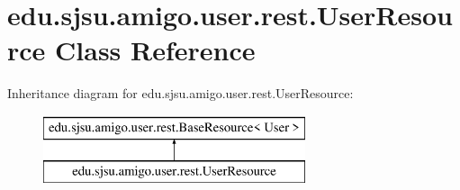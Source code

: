 \hypertarget{classedu_1_1sjsu_1_1amigo_1_1user_1_1rest_1_1_user_resource}{}\section{edu.\+sjsu.\+amigo.\+user.\+rest.\+User\+Resource Class Reference}
\label{classedu_1_1sjsu_1_1amigo_1_1user_1_1rest_1_1_user_resource}
Inheritance diagram for edu.\+sjsu.\+amigo.\+user.\+rest.\+User\+Resource\+:\begin{figure}[H]
\begin{center}
\leavevmode
\includegraphics[height=2.000000cm]{classedu_1_1sjsu_1_1amigo_1_1user_1_1rest_1_1_user_resource}
\end{center}
\end{figure}
